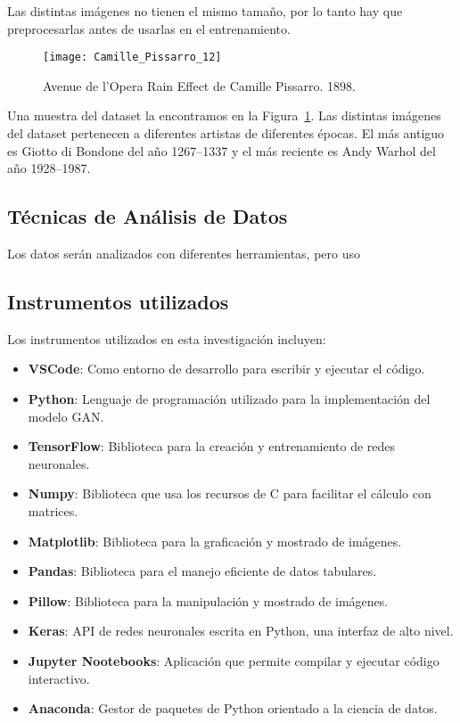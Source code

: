 \documentclass[../main.tex]{subfiles}
\begin{document}
Las distintas imágenes no tienen el mismo tamaño, por lo tanto hay que preprocesarlas antes de usarlas en el entrenamiento. 

\begin{figure}[htbp] %
    \centering
    \texttt{[image: Camille\_Pissarro\_12]} %
    \caption{Avenue de l'Opera Rain Effect de Camille Pissarro. 1898.}
    \label{fig:camille} %
\end{figure}

Una muestra del dataset la encontramos en la Figura~\ref{fig:camille}. Las distintas imágenes del dataset pertenecen a diferentes artistas de diferentes épocas. El más antiguo es Giotto di Bondone del año 1267–1337 y el más reciente es Andy Warhol  del año 1928–1987.

\subsection{Técnicas de Análisis de Datos}

Los datos serán analizados con diferentes herramientas, pero uso

\subsection{Instrumentos utilizados}

Los instrumentos utilizados en esta investigación incluyen:

\begin{itemize}
    \item \textbf{VSCode}: Como entorno de desarrollo para escribir y ejecutar el código.
    \item \textbf{Python}: Lenguaje de programación utilizado para la implementación del modelo GAN.
    \item \textbf{TensorFlow}: Biblioteca para la creación y entrenamiento de redes neuronales.
    \item \textbf{Numpy}: Biblioteca que usa los recursos de C para facilitar el cálculo con matrices.
    \item \textbf{Matplotlib}: Biblioteca para la graficación y mostrado de imágenes.
    \item \textbf{Pandas}: Biblioteca para el manejo
    eficiente de datos tabulares.
    \item \textbf{Pillow}: Biblioteca para la manipulación y mostrado de imágenes.
    \item \textbf{Keras}: API de redes neuronales escrita en Python, una interfaz de alto nivel.
    \item \textbf{Jupyter Nootebooks}: Aplicación que permite compilar y ejecutar código interactivo.
    \item \textbf{Anaconda}: Gestor de paquetes de Python orientado a la ciencia de datos.
\end{itemize}
\end{document}

